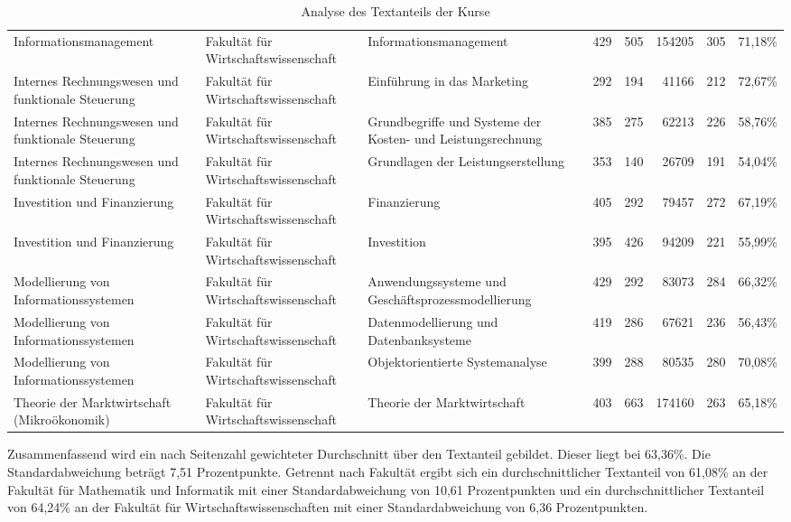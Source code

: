 \begin{sidewaystable}
{\begin{tabular}{lllrrrrr}
Informationsmanagement & Fakultät für Wirtschaftswissenschaft & Informationsmanagement & 429 & 505 & 154205 & 305 & 71,18\%\\
Internes Rechnungswesen und funktionale Steuerung & Fakultät für Wirtschaftswissenschaft & Einführung in das Marketing & 292 & 194 & 41166 & 212 & 72,67\%\\
Internes Rechnungswesen und funktionale Steuerung & Fakultät für Wirtschaftswissenschaft & Grundbegriffe und Systeme der Kosten- und Leistungsrechnung & 385 & 275 & 62213 & 226 & 58,76\%\\
Internes Rechnungswesen und funktionale Steuerung & Fakultät für Wirtschaftswissenschaft & Grundlagen der Leistungserstellung & 353 & 140 & 26709 & 191 & 54,04\%\\
Investition und Finanzierung & Fakultät für Wirtschaftswissenschaft & Finanzierung & 405 & 292 & 79457 &  272 & 67,19\%\\
Investition und Finanzierung & Fakultät für Wirtschaftswissenschaft & Investition & 395 & 426 & 94209 & 221 & 55,99\%\\
Modellierung von Informationssystemen & Fakultät für Wirtschaftswissenschaft & Anwendungssysteme und Geschäftsprozessmodellierung & 429 & 292 & 83073 & 284 & 66,32\%\\
Modellierung von Informationssystemen & Fakultät für Wirtschaftswissenschaft & Datenmodellierung und Datenbanksysteme & 419 & 286 & 67621 & 236 & 56,43\%\\
Modellierung von Informationssystemen & Fakultät für Wirtschaftswissenschaft & Objektorientierte Systemanalyse & 399 & 288 & 80535 & 280 & 70,08\%\\
Theorie der Marktwirtschaft (Mikroökonomik) & Fakultät für Wirtschaftswissenschaft & Theorie der Marktwirtschaft & 403 & 663 & 174160 & 263 & 65,18\%\\
\end{tabular}}
\caption{Analyse des Textanteils der Kurse}
\label{tab:AnalyseDesTextanteilsDerKurse}
\end{sidewaystable}

Zusammenfassend wird ein nach Seitenzahl gewichteter Durchschnitt über den Textanteil gebildet. Dieser liegt bei 63,36\%. Die Standardabweichung beträgt 7,51 Prozentpunkte. Getrennt nach Fakultät ergibt sich ein durchschnittlicher Textanteil von 61,08\% an der Fakultät für Mathematik und Informatik mit einer Standardabweichung von 10,61 Prozentpunkten und ein durchschnittlicher Textanteil von 64,24\% an der Fakultät für Wirtschaftswissenschaften mit einer Standardabweichung von 6,36 Prozentpunkten.

